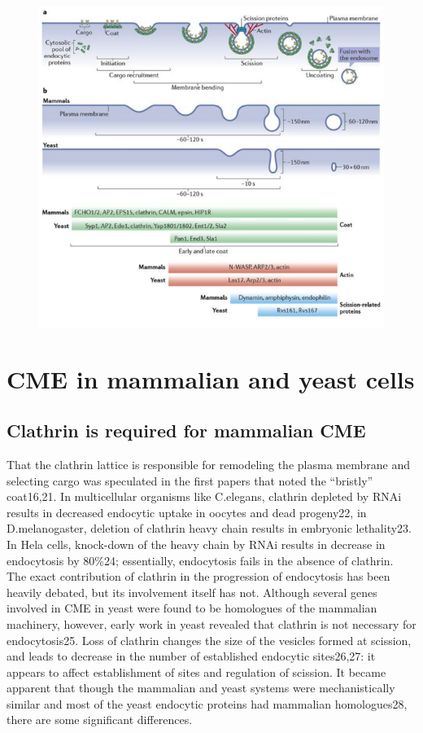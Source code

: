 \begin{figure}[H]
	\centering
	\includegraphics[scale=0.7]{figures/intro/fig3_screenshot}
\end{figure}



	
\section{CME in mammalian and yeast cells }
		\subsection{Clathrin is required for mammalian CME}
		That the clathrin lattice is responsible for remodeling the plasma membrane and selecting cargo was speculated in the first papers that noted the “bristly” coat16,21.  In multicellular organisms like C.elegans, clathrin depleted by RNAi results in decreased endocytic uptake in oocytes and dead progeny22, in D.melanogaster, deletion of clathrin heavy chain results in embryonic lethality23. In Hela cells, knock-down of the heavy chain by RNAi results in decrease in endocytosis by 80\%24; essentially, endocytosis fails in the absence of clathrin. The exact contribution of clathrin in the progression of endocytosis has been heavily debated, but its involvement itself has not. Although several genes involved in CME in yeast were found to be homologues of the mammalian machinery, however, early work in yeast revealed that clathrin is not necessary for endocytosis25. Loss of clathrin changes the size of the vesicles formed at scission, and leads to decrease in the number of established endocytic sites26,27: it appears to affect establishment of sites and regulation of scission. It became apparent that though the mammalian and yeast systems were mechanistically similar and most of the yeast endocytic proteins had mammalian homologues28, there are some significant differences.


